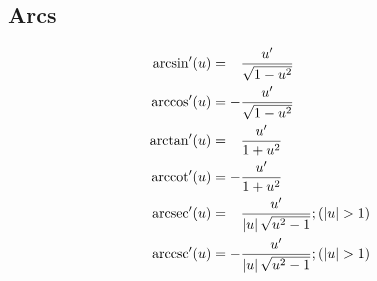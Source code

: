 \documentclass["AM3C-Slides_annotations.tex"]{subfiles}
\begin{document}
\begin{sectionBox}
\begin{multicols}{2}
    \subsection*{Arcs}
    \begin{align}
        \arcsin'(u)&= \phantom{-}\frac{u'}{\sqrt{1-u^2}} 
      \\ \arccos'(u)&=           -\frac{u'}{\sqrt{1-u^2}} 
      \\ \arctan'(u)&= \phantom{-}\frac{u'}{1+u^2}  
      \\ \operatorname{arccot}'(u)&=           -\frac{u'}{1+u^2}  
      \\ \operatorname{arcsec}'(u)&= \phantom{-}\frac{u'}{|u|\,\sqrt{u^2-1}};(|u| > 1) 
      \\ \operatorname{arccsc}'(u)&=           -\frac{u'}{|u|\,\sqrt{u^2-1}};(|u| > 1) 
    \end{align} 

  \end{multicols}
\end{sectionBox}
\end{document}
